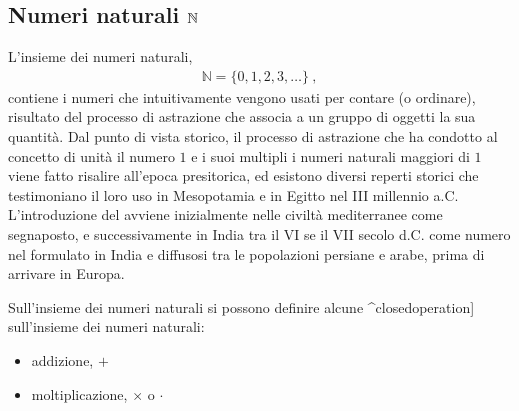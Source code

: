 \documentclass[letterpaper,10pt,italian]{jupyterBook}
\begin{document}
\subsection{Numeri naturali \protect\(\mathbb{N}\protect\)}
\label{\detokenize{ch/set/numeric-sets:numeri-naturali-mathbb-n}}\label{\detokenize{ch/set/numeric-sets:sets-numeric-n}}
\sphinxAtStartPar
L’insieme dei numeri naturali,
\begin{equation*}
\begin{split}\mathbb{N} = \{ 0, 1, 2, 3, \dots \} \ ,\end{split}
\end{equation*}
\sphinxAtStartPar
contiene i numeri che intuitivamente vengono usati per contare (o ordinare), risultato del processo di astrazione che associa a un gruppo di oggetti la sua quantità. Dal punto di vista storico, il processo di astrazione che ha condotto al concetto di unità \sphinxhyphen{} il numero \(1\) \sphinxhyphen{} e i suoi multipli \sphinxhyphen{} i numeri naturali maggiori di \(1\) \sphinxhyphen{} viene fatto risalire all’epoca presitorica, ed esistono diversi reperti storici che testimoniano il loro uso in Mesopotamia e in Egitto nel III millennio a.C. L’introduzione del  avviene inizialmente nelle civiltà mediterranee come segnaposto, e successivamente in India tra il VI se il VII secolo d.C. come numero nel  formulato in India e diffusosi tra le popolazioni persiane e arabe, prima di arrivare in Europa.

\sphinxAtStartPar
Sull’insieme dei numeri naturali si possono definire alcune \sphinxstyleemphasis{operazioni chiuse}{[}\textasciicircum{}closed\sphinxhyphen{}operation{]} sull’insieme dei numeri naturali:
\begin{itemize}
\item {} 
\sphinxAtStartPar
addizione, \(+\)

\item {} 
\sphinxAtStartPar
moltiplicazione, \(\times\) o \(\cdot\)

\end{itemize}
\end{document}
